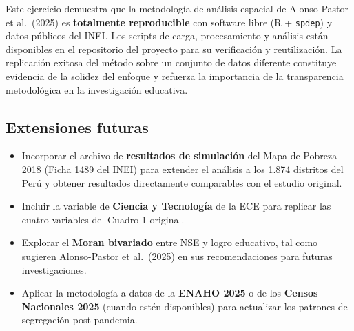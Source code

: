 \documentclass[12pt,a4paper]{article}
\begin{document}
Este ejercicio demuestra que la metodología de análisis espacial de Alonso-Pastor et al.\ (2025) es \textbf{totalmente reproducible} con software libre (R + \texttt{spdep}) y datos públicos del INEI. Los scripts de carga, procesamiento y análisis están disponibles en el repositorio del proyecto para su verificación y reutilización. La replicación exitosa del método sobre un conjunto de datos diferente constituye evidencia de la solidez del enfoque y refuerza la importancia de la transparencia metodológica en la investigación educativa.

\subsection{Extensiones futuras}

\begin{itemize}
  \item Incorporar el archivo de \textbf{resultados de simulación} del Mapa de Pobreza 2018 (Ficha 1489 del INEI) para extender el análisis a los 1.874 distritos del Perú y obtener resultados directamente comparables con el estudio original.
  \item Incluir la variable de \textbf{Ciencia y Tecnología} de la ECE para replicar las cuatro variables del Cuadro 1 original.
  \item Explorar el \textbf{Moran bivariado} entre NSE y logro educativo, tal como sugieren Alonso-Pastor et al.\ (2025) en sus recomendaciones para futuras investigaciones.
  \item Aplicar la metodología a datos de la \textbf{ENAHO 2025} o de los \textbf{Censos Nacionales 2025} (cuando estén disponibles) para actualizar los patrones de segregación post-pandemia.
\end{itemize}
\end{document}
